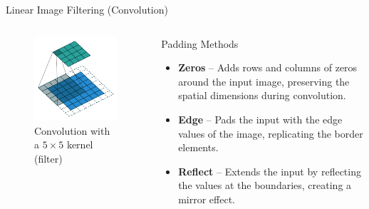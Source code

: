 \documentclass[british, svgnames, dvipsnames]{upb-beamer}
\newcommand{\stimes}{{\times}} %
\begin{document}
\begin{frame}{Linear Image Filtering (Convolution)}
    \begin{columns}
        \begin{column}{0.5\textwidth}
            \begin{figure}[h!]
                \centering
                \includegraphics[width=\linewidth]{img/conv.pdf}
                \caption{Convolution with a $5\stimes5$ kernel (filter)}
                \label{fig:conv}
            \end{figure}
        \end{column}
        \begin{column}{0.5\textwidth}
            \begin{block}{Padding Methods}
                \begin{itemize}
                    \setlength\itemsep{0.5cm}
                    \item \textbf{Zeros} -- Adds rows and columns of zeros around the input image, preserving the spatial dimensions during convolution.
                    \item \textbf{Edge} -- Pads the input with the edge values of the image, replicating the border elements.
                    \item \textbf{Reflect} -- Extends the input by reflecting the values at the boundaries, creating a mirror effect.
                \end{itemize}
            \end{block}
        \end{column}
    \end{columns}
\end{frame}
\end{document}
